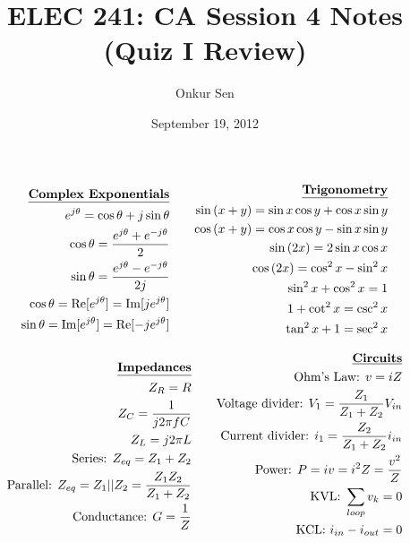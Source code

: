 \documentclass[11pt]{article}
\title{ELEC 241: CA Session 4 Notes (Quiz I Review)}
\author{Onkur Sen}
\date{September 19, 2012}
\begin{document}
\maketitle

\begin{eqnarray*}
\begin{split}
\mbox{{\bf \underline{Complex Exponentials}}}\\
e^{j\theta} = \cos{\theta} + j\sin{\theta}\\
\cos{\theta} = \frac{e^{j\theta} + e^{-j\theta}}{2}\\
\sin{\theta} = \frac{e^{j\theta} - e^{-j\theta}}{2j}\\
\cos{\theta} =\operatorname{Re}[e^{j\theta}] =\operatorname{Im}[je^{j\theta}]\\
\sin{\theta} =\operatorname{Im}[e^{j\theta}] =\operatorname{Re}[-je^{j\theta}]
\end{split}
\qquad
\begin{split}
\mbox{{\bf \underline{Trigonometry}}}\\
\sin{(x+y)} = \sin{x}\cos{y} + \cos{x}\sin{y}\\
\cos{(x+y)} = \cos{x}\cos{y} - \sin{x}\sin{y}\\
\sin{(2x)} = 2\sin{x}\cos{x}\\
\cos{(2x)} = \cos^2{x} - \sin^2{x}\\
\sin^2{x} + \cos^2{x} = 1\\
1 + \cot^2{x} = \csc^2{x}\\
\tan^2{x} + 1 = \sec^2{x}\\
\end{split}
\end{eqnarray*}

\begin{eqnarray*}
\begin{split}
\mbox{{\bf \underline{Impedances}}}\\
Z_R = R\\
Z_C = \frac{1}{j2\pi fC}\\
Z_L = j2\pi L\\
\mbox{Series: } Z_{eq} = Z_1+Z_2 \\
\mbox{Parallel: } Z_{eq} = Z_1 \vert \vert Z_2 = \frac{Z_1Z_2}{Z_1+Z_2} \\
\mbox{Conductance: } G = \frac{1}{Z}
\end{split}
\qquad
\begin{split}
\mbox{{\bf \underline{Circuits}}}\\
\mbox{Ohm's Law: } v = iZ\\
\mbox{Voltage divider: } V_1 = \frac{Z_1}{Z_1+Z_2}V_{in} \\
\mbox{Current divider: } i_1 = \frac{Z_2}{Z_1+Z_2}i_{in} \\
\mbox{Power: } P = iv = i^2 Z = \frac{v^2}{Z}\\
\mbox{KVL: } \sum_{loop} v_k = 0\\
\mbox{KCL: } i_{in} - i_{out} = 0\\
\end{split}
\end{eqnarray*}
\end{document}
